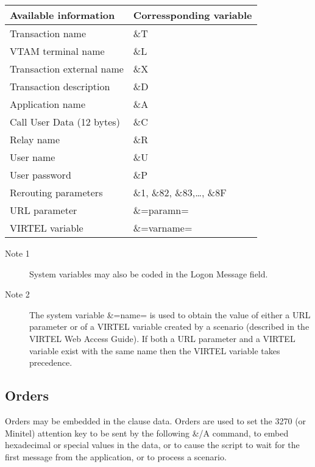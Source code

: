 \documentclass[letterpaper,10pt,english]{sphinxmanual}
\begin{document}
\begin{savenotes}\sphinxattablestart
\centering
\begin{tabulary}{\linewidth}[t]{|T|T|}
\hline
\sphinxstyletheadfamily 
Available information
&\sphinxstyletheadfamily 
Corressponding variable
\\
\hline
Transaction name
&
\&T
\\
\hline
VTAM terminal name
&
\&L
\\
\hline
Transaction external name
&
\&X
\\
\hline
Transaction description
&
\&D
\\
\hline
Application name
&
\&A
\\
\hline
Call User Data (12 bytes)
&
\&C
\\
\hline
Relay name
&
\&R
\\
\hline
User name
&
\&U
\\
\hline
User password
&
\&P
\\
\hline
Rerouting parameters
&
\&1, \&82, \&83,…, \&8F
\\
\hline
URL parameter
&
\&=paramn=
\\
\hline
VIRTEL variable
&
\&=varname=
\\
\hline
\end{tabulary}
\par
\sphinxattableend\end{savenotes}
\begin{description}
\item[{Note 1}] \leavevmode
System variables may also be coded in the Logon Message field.

\item[{Note 2}] \leavevmode
The system variable \&=name= is used to obtain the value of either a URL parameter or of a VIRTEL variable created by a scenario (described in the VIRTEL Web Access Guide). If both a URL parameter and a VIRTEL variable exist with the same name then the VIRTEL variable takes precedence.

\end{description}

\ignorespaces 

\subsection{Orders}
\label{\detokenize{connectivity_guide:orders}}\label{\detokenize{connectivity_guide:index-120}}
Orders may be embedded in the clause data. Orders are used to set the 3270 (or Minitel) attention key to be sent by the following \&/A command, to embed hexadecimal or special values in the data, or to cause the script to wait for the first message from the application, or to process a scenario.
\end{document}
